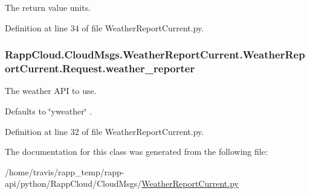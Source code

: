 The return value units. 



Definition at line 34 of file Weather\-Report\-Current.\-py.

\hypertarget{classRappCloud_1_1CloudMsgs_1_1WeatherReportCurrent_1_1WeatherReportCurrent_1_1Request_a1676bdd4402094a274203c3e3bc93688}{
\subsubsection[{weather\-\_\-reporter}]{\setlength{\rightskip}{0pt plus 5cm}Rapp\-Cloud.\-Cloud\-Msgs.\-Weather\-Report\-Current.\-Weather\-Report\-Current.\-Request.\-weather\-\_\-reporter}}\label{classRappCloud_1_1CloudMsgs_1_1WeatherReportCurrent_1_1WeatherReportCurrent_1_1Request_a1676bdd4402094a274203c3e3bc93688}


The weather A\-P\-I to use. 

Defaults to \char`\"{}yweather\char`\"{} . 

Definition at line 32 of file Weather\-Report\-Current.\-py.



The documentation for this class was generated from the following file\-:\begin{DoxyCompactItemize}
\item 
/home/travis/rapp\-\_\-temp/rapp-\/api/python/\-Rapp\-Cloud/\-Cloud\-Msgs/\hyperlink{WeatherReportCurrent_8py}{Weather\-Report\-Current.\-py}\end{DoxyCompactItemize}
